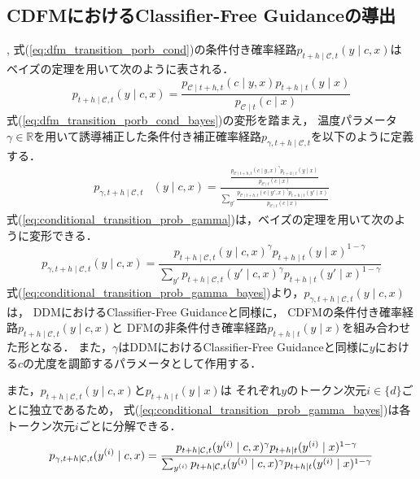 \documentclass[11pt]{jsarticle}  %
\begin{document}
\subsection{CDFMにおけるClassifier-Free Guidanceの導出},
式(\ref{eq:dfm_transition_porb_cond})の条件付き確率経路$p_{t+h \mid \mathcal{C}, t}(y \mid c, x)$は
ベイズの定理を用いて次のように表される．
\begin{equation}
  \label{eq:dfm_transition_porb_cond_bayes}
  p_{t+h \mid \mathcal{C}, t}(y \mid c, x) = \frac{p_{\mathcal{C} \mid t+h, t}(c \mid y, x)p_{t+h \mid t}(y \mid x)}{p_{\mathcal{C} \mid t}(c \mid x)} 
\end{equation}
式(\ref{eq:dfm_transition_porb_cond_bayes})の変形を踏まえ，
温度パラメータ$\gamma \in \mathbb{R}$を用いて誘導補正した条件付き補正確率経路$p_{\gamma, t+h \mid \mathcal{C}, t}$を以下のように定義する．
\begin{align}
  \label{eq:conditional_transition_prob_gamma}
  p_{\gamma, t+h \mid \mathcal{C}, t}&(y \mid c, x)
  = \frac{\frac{p_{\mathcal{C} \mid t+h, t}(c \mid y, x)^\gamma p_{t+h \mid t}(y \mid x)}{p_{\mathcal{C} \mid t}(c \mid x)}}{\sum_{y'} \frac{p_{\mathcal{C} \mid t+h, t}(c \mid y', x)^\gamma p_{t+h \mid t}(y' \mid x)}{p_{\mathcal{C} \mid t}(c \mid x)}}
\end{align}
式(\ref{eq:conditional_transition_prob_gamma})は，ベイズの定理を用いて次のように変形できる．
\begin{equation}
  \label{eq:conditional_transition_prob_gamma_bayes}
  p_{\gamma, t+h \mid \mathcal{C}, t}(y \mid c, x)
  = \frac
    {p_{t+h \mid \mathcal{C}, t}(y \mid c, x)^\gamma p_{t+h \mid t}(y \mid x)^{1-\gamma}}
    {\sum_{y'} p_{t+h \mid \mathcal{C}, t}(y' \mid c, x)^\gamma p_{t+h \mid t}(y' \mid x)^{1-\gamma}}
\end{equation}
式(\ref{eq:conditional_transition_prob_gamma_bayes})より，$p_{\gamma, t+h \mid \mathcal{C}, t}(y \mid c, x)$は，
DDMにおけるClassifier-Free Guidanceと同様に，
CDFMの条件付き確率経路$p_{t+h \mid \mathcal{C}, t}(y \mid c, x)$と
DFMの非条件付き確率経路$p_{t+h \mid t}(y \mid x)$を組み合わせた形となる．
また，$\gamma$はDDMにおけるClassifier-Free Guidanceと同様に$y$における$c$の尤度を調節するパラメータとして作用する．

また，$p_{t+h \mid \mathcal{C}, t}(y \mid c, x)$と$p_{t+h \mid t}(y \mid x)$は
それぞれ$y$のトークン次元$i \in \{d\}$ごとに独立であるため，
式(\ref{eq:conditional_transition_prob_gamma_bayes})は各トークン次元$i$ごとに分解できる．
\begin{equation}
  \label{eq:conditional_transition_prob_gamma_bayes_i}
  p_{\gamma, t+h \mid \mathcal{C}, t}(y^{(i)} \mid c, x)
    = \frac
    {p_{t+h \mid \mathcal{C}, t}(y^{(i)} \mid c, x)^\gamma p_{t+h \mid t}(y^{(i)} \mid x)^{1-\gamma}}
    {\sum_{y^{(i)}} p_{t+h \mid \mathcal{C}, t}(y^{(i)} \mid c, x)^\gamma p_{t+h \mid t}(y^{(i)} \mid x)^{1-\gamma}} \notag
\end{equation}
\end{document}
